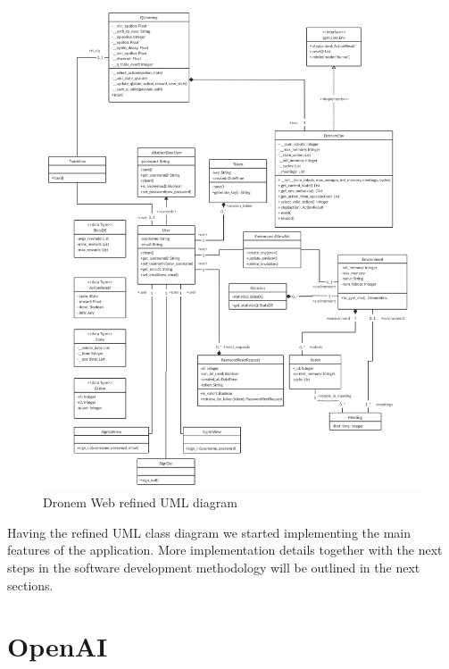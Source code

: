 \begin{figure}[!htb]
    \centering
    \includegraphics[scale=0.18]{Figures/umlComplete.jpg}
    \caption{Dronem Web refined UML diagram}
    \label{fig:refineDiag}
\end{figure}

\newpage
Having the refined UML class diagram we started implementing the main features of the application. More implementation details together with the next steps in the software development methodology will be outlined in the next sections.

\section{OpenAI}\label{softOpenAI}

